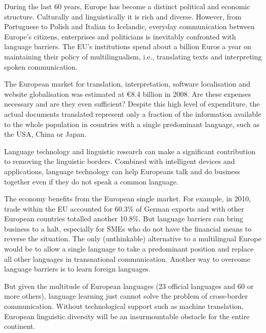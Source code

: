 \documentclass[10pt, plain]{../../metanetpaper}
\begin{document}
\clearpage



\begin{multicols}{2}
During the last 60 years, Europe has become a distinct political and economic structure. Culturally and linguistically it is rich and diverse. However, from Portuguese to Polish and Italian to Icelandic, everyday communication between Europe's citizens, enterprises and politicians is inevitably confronted with language barriers. The EU's institutions spend about a billion Euros a year on maintaining their policy of multilingualism, i.e., translating texts and interpreting spoken communication.

The European market for translation, interpretation, software localisation and website globalisation was estimated at €8.4 billion in 2008. Are these expenses necessary and are they even sufficient? Despite this high level of expenditure, the actual documents translated represent only a fraction of the information available to the whole population in countries with a single predominant language, such as the USA, China or Japan.

Language technology and linguistic research can make a significant contribution to removing the linguistic borders. Combined with intelligent devices and applications, language technology can help Europeans talk and do business together even if they do not speak a common language.

The economy benefits from the European single market. For example, in 2010, trade within the EU accounted for 60.3\% of German exports and with other European countries totalled another 10.8\%. But language barriers can bring business to a halt, especially for SMEs who do not have the financial means to reverse the situation. The only (unthinkable) alternative to a multilingual Europe would be to allow a single language to take a predominant position and replace all other languages in transnational communication. Another way to overcome language barriers is to learn foreign languages.

But given the multitude of European languages (23 official languages and 60 or more others), language learning just cannot solve the problem of cross-border communication. Without technological support such as machine translation, European linguistic diversity will be an insurmountable obstacle for the entire continent.


\end{multicols}
\end{document}
